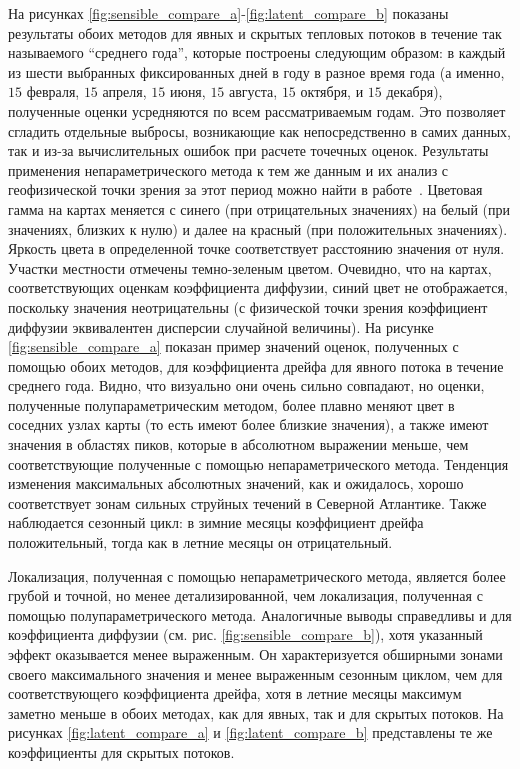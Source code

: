 На рисунках \ref{fig:sensible_compare_a}-\ref{fig:latent_compare_b} показаны результаты обоих методов для явных и скрытых тепловых потоков в течение так называемого “среднего года”, которые построены следующим образом: в каждый из шести выбранных фиксированных дней в году в разное время года (а именно, $15$ февраля, $15$ апреля, $15$ июня, $15$ августа, $15$ октября, и $15$ декабря), полученные оценки усредняются по всем рассматриваемым годам. Это позволяет сгладить отдельные выбросы, возникающие как непосредственно в самих данных, так и из-за вычислительных ошибок при расчете точечных оценок. Результаты применения непараметрического метода к тем же данным и их анализ с геофизической точки зрения за этот период можно найти в работе~\cite{Gorshenin2023}.
Цветовая гамма на картах меняется с синего (при отрицательных значениях) на белый (при значениях, близких к нулю) и далее на красный (при положительных значениях). Яркость цвета в определенной точке соответствует расстоянию значения от нуля. Участки местности отмечены темно-зеленым цветом. Очевидно, что на картах, соответствующих оценкам коэффициента диффузии, синий цвет не отображается, поскольку значения неотрицательны (с физической точки зрения коэффициент диффузии эквивалентен дисперсии случайной величины).
На рисунке \ref{fig:sensible_compare_a} показан пример значений оценок, полученных с помощью обоих методов, для коэффициента дрейфа для явного потока в течение среднего года. Видно, что визуально они очень сильно совпадают, но оценки, полученные полупараметрическим методом, более плавно меняют цвет в соседних узлах карты (то есть имеют более близкие значения), а также имеют значения в областях пиков, которые в абсолютном выражении меньше, чем соответствующие полученные с помощью непараметрического метода. Тенденция изменения максимальных абсолютных значений, как и ожидалось, хорошо соответствует зонам сильных струйных течений в Северной Атлантике. Также наблюдается сезонный цикл: в зимние месяцы коэффициент дрейфа положительный, тогда как в летние месяцы он отрицательный.

Локализация, полученная с помощью непараметрического метода, является более грубой и точной, но менее детализированной, чем локализация, полученная с помощью полупараметрического метода. Аналогичные выводы справедливы и для коэффициента диффузии (см. рис. \ref{fig:sensible_compare_b}), хотя указанный эффект оказывается менее выраженным. Он характеризуется обширными зонами своего максимального значения и менее выраженным сезонным циклом, чем для соответствующего коэффициента дрейфа, хотя в летние месяцы максимум заметно меньше в обоих методах, как для явных, так и для скрытых потоков. На рисунках \ref{fig:latent_compare_a} и \ref{fig:latent_compare_b} представлены те же коэффициенты для скрытых потоков.

